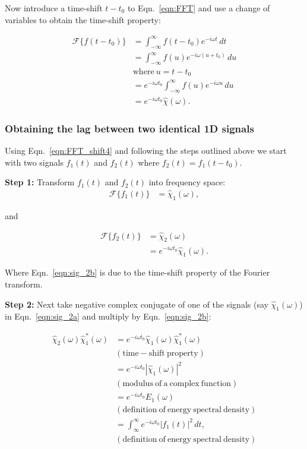 \documentclass[%
 reprint,
 amsmath,amssymb,
 aps,
floatfix,
]{revtex4-2}
\begin{document}
Now introduce a time-shift $t-t_0$ to Eqn.~\ref{eqn:FFT} and use a change of variables to obtain the time-shift property:

\begin{align}
    \mathcal{F}\{f(t-t_0)\} &= \int^{\infty}_{-\infty} f(t-t_0)e^{-i\omega t}\,dt \label{eqn:FFT_shift1} \\
    &= \int^{\infty}_{-\infty} f(u)e^{-i\omega (u+t_0)}\,du\label{eqn:FFT_shift2}\\ 
    & \mathrm{where}\: u=t-t_0 \nonumber \\
    &= e^{-i\omega t_0}\int^{\infty}_{-\infty} f(u)e^{-i\omega u}\,du\label{eqn:FFT_shift3}\\ 
    &= e^{-i\omega t_0}\hat{\chi}(\omega).\label{eqn:FFT_shift4}
\end{align} 

\subsubsection{Obtaining the lag between two identical 1D signals}
Using Eqn.~\ref{eqn:FFT_shift4} and following the steps outlined above we start with two signals $f_1(t)$ and $f_2(t)$ where $f_2(t)=f_1(t-t_0)$.

\textbf{Step 1:} Transform $f_1(t)$ and $f_2(t)$ into frequency space: 
\begin{align}
    \mathcal{F}\{f_1(t)\} &= \hat{\chi}_1(\omega),\label{eqn:sig_2a}
\end{align}

and

\begin{align}
    \mathcal{F}\{f_2(t)\} &= \hat{\chi}_2(\omega)\nonumber \\
    &= e^{-i\omega t_0}\hat{\chi}_1(\omega).\label{eqn:sig_2b}
\end{align}

Where Eqn.~\ref{eqn:sig_2b} is due to the time-shift property of the Fourier transform.

\textbf{Step 2:} Next take negative complex conjugate of one of the signals (say $\hat{\chi}_1(\omega)$) in Eqn.~\ref{eqn:sig_2a} and multiply by Eqn.~\ref{eqn:sig_2b}:

\begin{align}
    \hat{\chi}_2(\omega)\hat{\chi}_1^{*}(\omega)&=
    e^{-i\omega t_0}\hat{\chi}_1(\omega)\hat{\chi}_1^{*}(\omega)\\
    &\mathrm{(time-shift\:property)}\nonumber\\
    &=e^{-i\omega t_0}|\hat{\chi}_1(\omega)|^2\label{eqn:sig_4}\\
    &\mathrm{(modulus\:of\:a\:complex\:function)}\nonumber\\
    &=e^{-i\omega t_0}E_1(\omega)\\
    &\mathrm{(definition\: of\: energy\: spectral\: density)}\nonumber\\
    &=\int^{\infty}_{\infty} e^{-i\omega t_0}|f_{1}(t)|^{2}\,dt,\\
    &\mathrm{(definition\: of\: energy\: spectral\: density)}\nonumber
\end{align}
\end{document}
